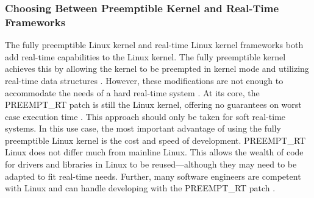             \subsubsection{Choosing Between Preemptible Kernel and Real-Time Frameworks}
            \markboth{}{}
                The fully preemptible Linux kernel and real-time Linux kernel
                    frameworks both add real-time capabilities to the Linux
                    kernel.
                The fully preemptible kernel achieves this by allowing the
                    kernel to be preempted in kernel mode and utilizing
                    real-time data structures \cite{linux-preemption-models}.
                However, these modifications are not enough to accommodate the
                    needs of a hard real-time system \cite{preempt-rt-survey}.
                At its core, the PREEMPT\_RT patch is still the Linux kernel,
                    offering no guarantees on worst case execution time
                    \cite{preempt-rt-survey}.
                This approach should only be taken for soft real-time systems.
                In this use case, the most important advantage of using the
                    fully preemptible Linux kernel is the cost and speed of
                    development.
                PREEMPT\_RT Linux does not differ much from mainline Linux.
                This allows the wealth of code for drivers and libraries in
                    Linux to be reused---although they may need to be adapted to
                    fit real-time needs.
                Further, many software engineers are competent with Linux and
                    can handle developing with the PREEMPT\_RT patch
                    \cite{preempt-rt-survey}.

